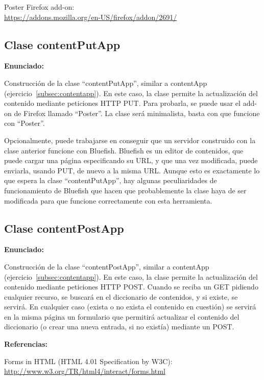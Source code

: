 Poster Firefox add-on: \\
\url{https://addons.mozilla.org/en-US/firefox/addon/2691/}

\subsection{Clase contentPutApp}
\label{subsec:contentputapp}

\textbf{Enunciado:}

Construcción de la clase ``contentPutApp'', similar a contentApp (ejercicio~\ref{subsec:contentapp}). En este caso, la clase permite la actualización del contenido mediante peticiones HTTP PUT. Para probarla, se puede usar el add-on de Firefox llamado ``Poster''. La clase será minimalista, basta con que funcione con ``Poster''.

Opcionalmente, puede trabajarse en conseguir que un servidor construido con la clase anterior funcione con Bluefish. Bluefish es un editor de contenidos, que puede cargar una página especificando su URL, y que una vez modificada, puede enviarla, usando PUT, de nuevo a la misma URL. Aunque esto es exactamente lo que espera la clase ``contentPutApp'', hay algunas peculiaridades de funcionamiento de Bluefish que hacen que probablemente la clase haya de ser modificada para que funcione correctamente con esta herramienta.

\subsection{Clase contentPostApp}
\label{subsec:contentpostapp}

\textbf{Enunciado:}

Construcción de la clase ``contentPostApp'', similar a contentApp (ejercicio~\ref{subsec:contentapp}). En este caso, la clase permite la actualización del contenido mediante peticiones HTTP POST. Cuando se reciba un GET pidiendo cualquier recurso, se buscará en el diccionario de contenidos, y si existe, se servirá. En cualquier caso (exista o no exista el contenido en cuestión) se servirá en la misma página un formulario que permitirá actualizar el contenido del diccionario (o crear una nueva entrada, si no existía) mediante un POST.

\textbf{Referencias:}

Forms in HTML (HTML 4.01 Specification by W3C): \\
\url{http://www.w3.org/TR/html4/interact/forms.html}

